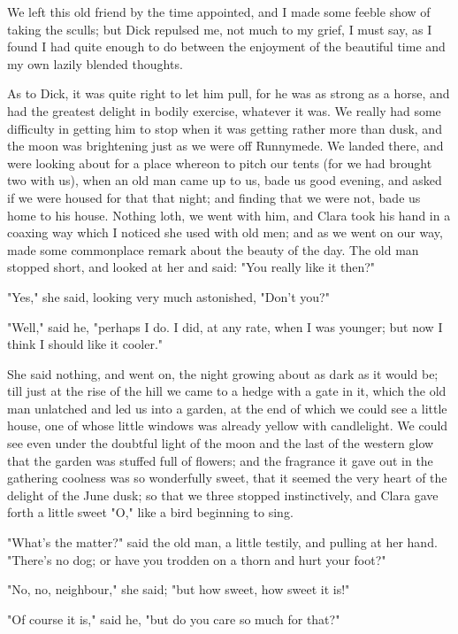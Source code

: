 We left this old friend by the time appointed, and I made some feeble
show of taking the sculls; but Dick repulsed me, not much to my grief, I
must say, as I found I had quite enough to do between the enjoyment of
the beautiful time and my own lazily blended thoughts.

As to Dick, it was quite right to let him pull, for he was as strong as
a horse, and had the greatest delight in bodily exercise, whatever it
was. We really had some difficulty in getting him to stop when it was
getting rather more than dusk, and the moon was brightening just as we
were off Runnymede. We landed there, and were looking about for a place
whereon to pitch our tents (for we had brought two with us), when an old
man came up to us, bade us good evening, and asked if we were housed for
that that night; and finding that we were not, bade us home to his
house. Nothing loth, we went with him, and Clara took his hand in a
coaxing way which I noticed she used with old men; and as we went on our
way, made some commonplace remark about the beauty of the day. The old
man stopped short, and looked at her and said: "You really like it
then?"

"Yes," she said, looking very much astonished, "Don't you?"

"Well," said he, "perhaps I do. I did, at any rate, when I was younger;
but now I think I should like it cooler."

She said nothing, and went on, the night growing about as dark as it
would be; till just at the rise of the hill we came to a hedge with a
gate in it, which the old man unlatched and led us into a garden, at the
end of which we could see a little house, one of whose little windows
was already yellow with candlelight. We could see even under the
doubtful light of the moon and the last of the western glow that the
garden was stuffed full of flowers; and the fragrance it gave out in the
gathering coolness was so wonderfully sweet, that it seemed the very
heart of the delight of the June dusk; so that we three stopped
instinctively, and Clara gave forth a little sweet "O," like a bird
beginning to sing.

"What's the matter?" said the old man, a little testily, and pulling at
her hand. "There's no dog; or have you trodden on a thorn and hurt your
foot?"

"No, no, neighbour," she said; "but how sweet, how sweet it is!"

"Of course it is," said he, "but do you care so much for that?"

